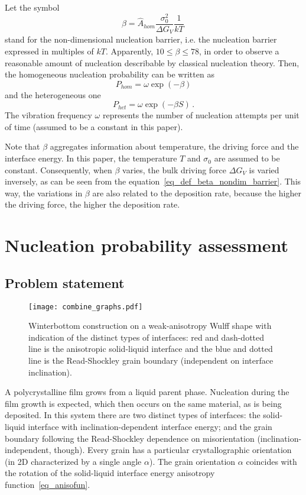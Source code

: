 	Let the symbol 
	\begin{equation}\label{eq_def_beta_nondim_barrier}
		\beta = \hat{A}_{hom}\frac{\sigma_0^2}{\Delta G_V}\frac{1}{kT}\,
	\end{equation}
	stand for the non-dimensional nucleation barrier, i.e. the nucleation barrier expressed in multiples of $kT$. Apparently, $10\leq\beta\leq78$, in order to observe a reasonable amount of nucleation describable by classical nucleation theory. Then, the homogeneous nucleation probability can be written as
	\begin{equation}
		P_{hom} = \omega\exp(-\beta)
	\end{equation}
	and the heterogeneous one
	\begin{equation}
		P_{het} = \omega\exp(-\beta S) \,.
	\end{equation}
	The vibration frequency $\omega$ represents the number of nucleation attempts per unit of time (assumed to be a constant in this paper).
	
	Note that $\beta$ aggregates information about temperature, the driving force and the interface energy. In this paper, the temperature $T$ and $\sigma_0$ are assumed to be constant. Consequently, when $\beta$ varies, the bulk driving force $\Delta G_V$ is varied inversely, as can be seen from the equation~\eqref{eq_def_beta_nondim_barrier}. This way, the variations in $\beta$ are also related to the deposition rate, because the higher the driving force, the higher the deposition rate.    

\section{Nucleation probability assessment} \label{sec_NPA}
	\subsection{Problem statement}
	\begin{figure}
		\centering
		\texttt{[image: combine\_graphs.pdf]}
		\caption{Winterbottom construction on a weak-anisotropy Wulff shape with indication of the distinct types of interfaces: red and dash-dotted line is the anisotropic solid-liquid interface and the blue and dotted line is the Read-Shockley grain boundary (independent on interface inclination). }
		\label{fig_NPA_sketch_of_problem}
	\end{figure}
	A polycrystalline film grows from a liquid parent phase. Nucleation during the film growth is expected, which then occurs on the same material, as is being deposited. In this system there are two distinct types of interfaces: the solid-liquid interface with inclination-dependent interface energy; and the grain boundary following the Read-Shockley dependence on misorientation (inclination-independent, though). Every grain has a particular crystallographic orientation (in 2D characterized by a single angle $\alpha$). The grain orientation $\alpha$ coincides with the rotation of the solid-liquid interface energy anisotropy function~\eqref{eq_anisofun}.
	
